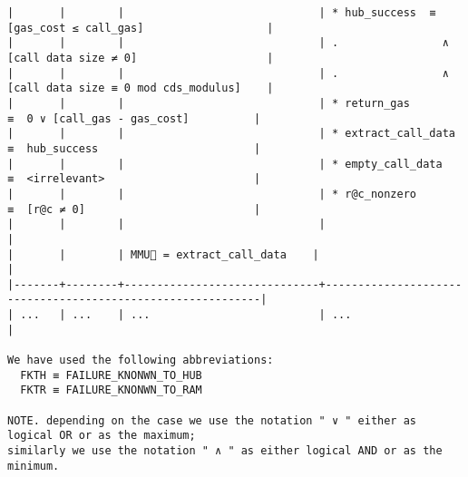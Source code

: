 \documentclass[varwidth=\maxdimen,margin=0.5cm,multi={verbatim}]{standalone}
\begin{document}
\begin{verbatim}
|       |        |                              | * hub_success  ≡   [gas_cost ≤ call_gas]                   |
|       |        |                              | .                ∧ [call data size ≠ 0]                    |
|       |        |                              | .                ∧ [call data size ≡ 0 mod cds_modulus]    |
|       |        |                              | * return_gas         ≡  0 ∨ [call_gas - gas_cost]          |
|       |        |                              | * extract_call_data  ≡  hub_success                        |
|       |        |                              | * empty_call_data    ≡  <irrelevant>                       |
|       |        |                              | * r@c_nonzero        ≡  [r@c ≠ 0]                          |
|       |        |                              |                                                            |
|       |        | MMU🏴 = extract_call_data    |                                                            |
|-------+--------+------------------------------+------------------------------------------------------------|
| ...   | ...    | ...                          | ...                                                        |

We have used the following abbreviations:
  FKTH ≡ FAILURE_KNONWN_TO_HUB
  FKTR ≡ FAILURE_KNONWN_TO_RAM

NOTE. depending on the case we use the notation " ∨ " either as logical OR or as the maximum;
similarly we use the notation " ∧ " as either logical AND or as the minimum.
\end{verbatim}
\end{document}
